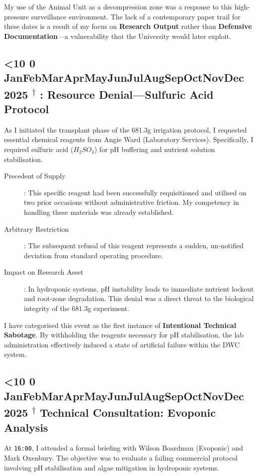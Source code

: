 \documentclass{EMBASSY}
\DeclareRobustCommand{\gmt}[3]{%
    \texorpdfstring{%
        {\color{DateGold}\textbf{%
            \ifnum#1<10 0\fi#1\,\textperiodcentered\,%
            \ifcase#2\or Jan\or Feb\or Mar\or Apr\or May\or Jun\or Jul\or Aug\or Sep\or Oct\or Nov\or Dec\fi
            \,\textperiodcentered\,20#3%
            \textsuperscript{$\dagger$}%
        }}%
    }{%
        (#1/#2/#3)%
    }%
}
\begin{document}
\noindent My use of the Animal Unit as a decompression zone was a response to this high-pressure surveillance environment. The lack of a contemporary paper trail for these dates is a result of my focus on \textbf{Research Output} rather than \textbf{Defensive Documentation}---a vulnerability that the University would later exploit.

\subsection{\gmt{18}{10}{25}: Resource Denial---Sulfuric Acid Protocol}
As I initiated the transplant phase of the 681.3g irrigation protocol, I requested essential chemical reagents from Angie Ward (Laboratory Services). Specifically, I required sulfuric acid ($H_{2}SO_{4}$) for pH buffering and nutrient solution stabilisation.

\begin{description}
	\item[Precedent of Supply]: This specific reagent had been successfully requisitioned and utilised on two prior occasions without administrative friction. My competency in handling these materials was already established.
	\item[Arbitrary Restriction]: The subsequent refusal of this reagent represents a sudden, un-notified deviation from standard operating procedure.
	\item[Impact on Research Asset]: In hydroponic systems, pH instability leads to immediate nutrient lockout and root-zone degradation. This denial was a direct threat to the biological integrity of the 681.3g experiment.
\end{description}

\noindent I have categorised this event as the first instance of \textbf{Intentional Technical Sabotage}. By withholding the reagents necessary for pH stabilisation, the lab administration effectively induced a state of artificial failure within the DWC system.

\subsection{\gmt{23}{10}{25} Technical Consultation: Evoponic Analysis}
At \texttt{16:00}, I attended a formal briefing with Wilson Boardman (Evoponic) and Mark Oxenbury. The objective was to evaluate a failing commercial protocol involving pH stabilisation and algae mitigation in hydroponic systems.
\end{document}

